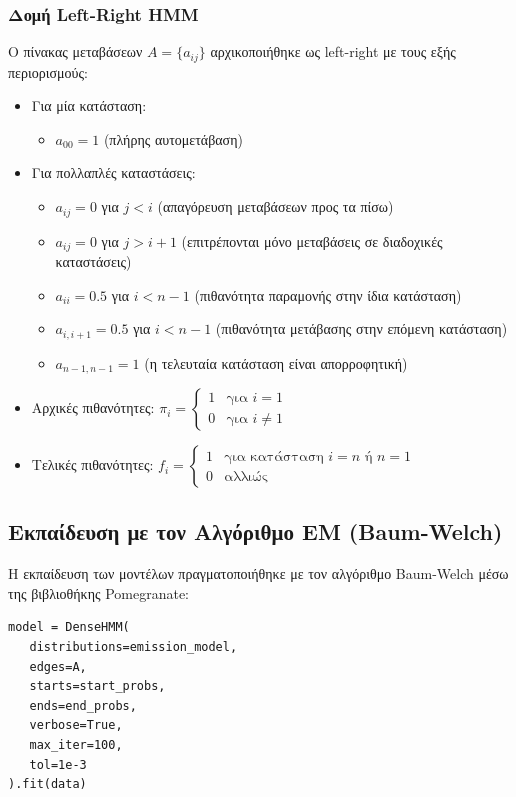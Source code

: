 \documentclass[a4paper,12pt]{article}
\begin{document}
\subsubsection*{Δομή Left-Right HMM}
Ο πίνακας μεταβάσεων $A = \{a_{ij}\}$ αρχικοποιήθηκε ως left-right με τους εξής περιορισμούς:
\begin{itemize}
    \item Για μία κατάσταση:
          \begin{itemize}
              \item $a_{00} = 1$ (πλήρης αυτομετάβαση)
          \end{itemize}
    \item Για πολλαπλές καταστάσεις:
          \begin{itemize}
              \item $a_{ij} = 0$ για $j < i$ (απαγόρευση μεταβάσεων προς τα πίσω)
              \item $a_{ij} = 0$ για $j > i + 1$ (επιτρέπονται μόνο μεταβάσεις σε διαδοχικές καταστάσεις)
              \item $a_{ii} = 0.5$ για $i < n-1$ (πιθανότητα παραμονής στην ίδια κατάσταση)
              \item $a_{i,i+1} = 0.5$ για $i < n-1$ (πιθανότητα μετάβασης στην επόμενη κατάσταση)
              \item $a_{n-1,n-1} = 1$ (η τελευταία κατάσταση είναι απορροφητική)
          \end{itemize}
    \item Αρχικές πιθανότητες: $\pi_i = \begin{cases} 1 & \text{για } i = 1 \\ 0 & \text{για } i \neq 1 \end{cases}$
    \item Τελικές πιθανότητες: $f_i = \begin{cases} 1 & \text{για κατάσταση } i = n \text{ ή } n=1 \\ 0 & \text{αλλιώς} \end{cases}$
\end{itemize}

\subsection*{Εκπαίδευση με τον Αλγόριθμο EM (Baum-Welch)}
Η εκπαίδευση των μοντέλων πραγματοποιήθηκε με τον αλγόριθμο Baum-Welch μέσω της βιβλιοθήκης Pomegranate:
\begin{verbatim}
model = DenseHMM(
   distributions=emission_model,
   edges=A,
   starts=start_probs,
   ends=end_probs,
   verbose=True,
   max_iter=100,
   tol=1e-3
).fit(data)
\end{verbatim}
\end{document}
